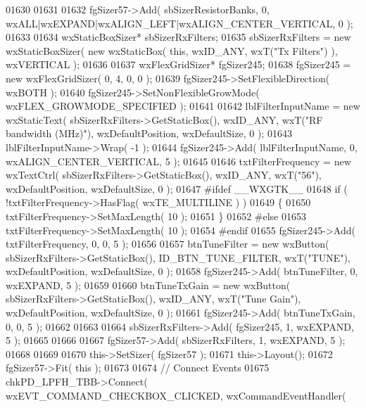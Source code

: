 \begin{DoxyCode}
01630     
01631     
01632     fgSizer57->Add( sbSizerResistorBanks, 0, wxALL|wxEXPAND|wxALIGN\_LEFT|wxALIGN\_CENTER\_VERTICAL, 0 );
01633     
01634     wxStaticBoxSizer* sbSizerRxFilters;
01635     sbSizerRxFilters = \textcolor{keyword}{new} wxStaticBoxSizer( \textcolor{keyword}{new} wxStaticBox( \textcolor{keyword}{this}, wxID\_ANY, wxT(\textcolor{stringliteral}{"Tx Filters"}) ), 
      wxVERTICAL );
01636     
01637     wxFlexGridSizer* fgSizer245;
01638     fgSizer245 = \textcolor{keyword}{new} wxFlexGridSizer( 0, 4, 0, 0 );
01639     fgSizer245->SetFlexibleDirection( wxBOTH );
01640     fgSizer245->SetNonFlexibleGrowMode( wxFLEX\_GROWMODE\_SPECIFIED );
01641     
01642     lblFilterInputName = \textcolor{keyword}{new} wxStaticText( sbSizerRxFilters->GetStaticBox(), wxID\_ANY, wxT(\textcolor{stringliteral}{"RF bandwidth
       (MHz)"}), wxDefaultPosition, wxDefaultSize, 0 );
01643     lblFilterInputName->Wrap( -1 );
01644     fgSizer245->Add( lblFilterInputName, 0, wxALIGN\_CENTER\_VERTICAL, 5 );
01645     
01646     txtFilterFrequency = \textcolor{keyword}{new} wxTextCtrl( sbSizerRxFilters->GetStaticBox(), wxID\_ANY, wxT(\textcolor{stringliteral}{"56"}), 
      wxDefaultPosition, wxDefaultSize, 0 );
01647 \textcolor{preprocessor}{    #ifdef \_\_WXGTK\_\_}
01648     \textcolor{keywordflow}{if} ( !txtFilterFrequency->HasFlag( wxTE\_MULTILINE ) )
01649     \{
01650     txtFilterFrequency->SetMaxLength( 10 );
01651     \}
01652 \textcolor{preprocessor}{    #else}
01653     txtFilterFrequency->SetMaxLength( 10 );
01654 \textcolor{preprocessor}{    #endif}
01655     fgSizer245->Add( txtFilterFrequency, 0, 0, 5 );
01656     
01657     btnTuneFilter = \textcolor{keyword}{new} wxButton( sbSizerRxFilters->GetStaticBox(), 
      ID_BTN_TUNE_FILTER, wxT(\textcolor{stringliteral}{"TUNE"}), wxDefaultPosition, wxDefaultSize, 0 );
01658     fgSizer245->Add( btnTuneFilter, 0, wxEXPAND, 5 );
01659     
01660     btnTuneTxGain = \textcolor{keyword}{new} wxButton( sbSizerRxFilters->GetStaticBox(), wxID\_ANY, wxT(\textcolor{stringliteral}{"Tune Gain"}), 
      wxDefaultPosition, wxDefaultSize, 0 );
01661     fgSizer245->Add( btnTuneTxGain, 0, 0, 5 );
01662     
01663     
01664     sbSizerRxFilters->Add( fgSizer245, 1, wxEXPAND, 5 );
01665     
01666     
01667     fgSizer57->Add( sbSizerRxFilters, 1, wxEXPAND, 5 );
01668     
01669     
01670     this->SetSizer( fgSizer57 );
01671     this->Layout();
01672     fgSizer57->Fit( \textcolor{keyword}{this} );
01673     
01674     \textcolor{comment}{// Connect Events}
01675     chkPD_LPFH_TBB->Connect( wxEVT\_COMMAND\_CHECKBOX\_CLICKED, wxCommandEventHandler( 

\end{DoxyCode}
